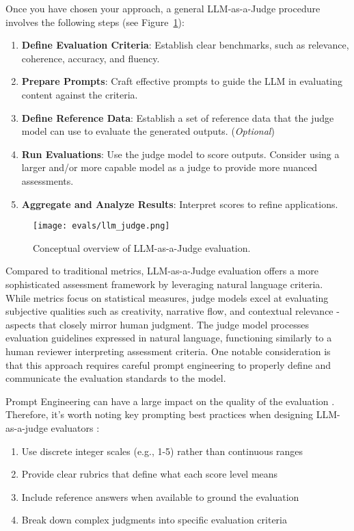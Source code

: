 Once you have chosen your approach, a general LLM-as-a-Judge procedure involves the following steps (see Figure~\ref{fig:llm_judge}):
\begin{enumerate}
    \item \textbf{Define Evaluation Criteria}: Establish clear benchmarks, such as relevance, coherence, accuracy, and fluency.
    \item \textbf{Prepare Prompts}: Craft effective prompts to guide the LLM in evaluating content against the criteria.
    \item \textbf{Define Reference Data}: Establish a set of reference data that the judge model can use to evaluate the generated outputs. (\textit{Optional})
    \item \textbf{Run Evaluations}: Use the judge model to score outputs. Consider using a larger and/or more capable model as a judge to provide more nuanced assessments.
    \item \textbf{Aggregate and Analyze Results}: Interpret scores to refine applications.
\end{enumerate}

\begin{figure}[h]
\centering
\texttt{[image: evals/llm\_judge.png]}
\caption{Conceptual overview of LLM-as-a-Judge evaluation.}
\label{fig:llm_judge}
\end{figure}

Compared to traditional metrics, LLM-as-a-Judge evaluation offers a more sophisticated assessment framework by leveraging natural language criteria. While metrics focus on statistical measures, judge models excel at evaluating subjective qualities such as creativity, narrative flow, and contextual relevance - aspects that closely mirror human judgment. The judge model processes evaluation guidelines expressed in natural language, functioning similarly to a human reviewer interpreting assessment criteria. One notable consideration is that this approach requires careful prompt engineering to properly define and communicate the evaluation standards to the model.

Prompt Engineering can have a large impact on the quality of the evaluation . Therefore, it's worth noting key prompting best practices when designing LLM-as-a-judge evaluators :
\begin{enumerate}
    \item Use discrete integer scales (e.g., 1-5) rather than continuous ranges 
    \item Provide clear rubrics that define what each score level means
    \item Include reference answers when available to ground the evaluation
    \item Break down complex judgments into specific evaluation criteria
\end{enumerate}

